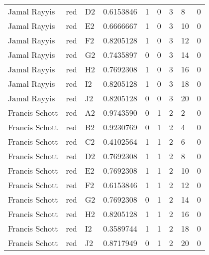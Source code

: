 \documentclass[11pt]{article}
\begin{document}
\begin{tabular}{lllllllll}
	 Jamal Rayyis    & red & D2 & 0.6153846 & 1 & 0 & 3 &  8 & 0\\
	 Jamal Rayyis    & red & E2 & 0.6666667 & 1 & 0 & 3 & 10 & 0\\
	 Jamal Rayyis    & red & F2 & 0.8205128 & 1 & 0 & 3 & 12 & 0\\
	 Jamal Rayyis    & red & G2 & 0.7435897 & 0 & 0 & 3 & 14 & 0\\
	 Jamal Rayyis    & red & H2 & 0.7692308 & 1 & 0 & 3 & 16 & 0\\
	 Jamal Rayyis    & red & I2 & 0.8205128 & 1 & 0 & 3 & 18 & 0\\
	 Jamal Rayyis    & red & J2 & 0.8205128 & 0 & 0 & 3 & 20 & 0\\
	 Francis Schott  & red & A2 & 0.9743590 & 0 & 1 & 2 &  2 & 0\\
	 Francis Schott  & red & B2 & 0.9230769 & 0 & 1 & 2 &  4 & 0\\
	 Francis Schott  & red & C2 & 0.4102564 & 1 & 1 & 2 &  6 & 0\\
	 Francis Schott  & red & D2 & 0.7692308 & 1 & 1 & 2 &  8 & 0\\
	 Francis Schott  & red & E2 & 0.7692308 & 1 & 1 & 2 & 10 & 0\\
	 Francis Schott  & red & F2 & 0.6153846 & 1 & 1 & 2 & 12 & 0\\
	 Francis Schott  & red & G2 & 0.7692308 & 0 & 1 & 2 & 14 & 0\\
	 Francis Schott  & red & H2 & 0.8205128 & 1 & 1 & 2 & 16 & 0\\
	 Francis Schott  & red & I2 & 0.3589744 & 1 & 1 & 2 & 18 & 0\\
	 Francis Schott  & red & J2 & 0.8717949 & 0 & 1 & 2 & 20 & 0\\
\end{tabular}


    
    \begin{center}
    \end{center}
    { \hspace*{\fill} \\}
    
\end{document}
